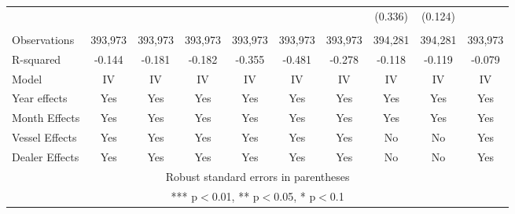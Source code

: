 \begin{tabular}{lccccccccc}
 &  &  &  &  &  &  & (0.336) & (0.124) &  \\
 &  &  &  &  &  &  &  &  &  \\
Observations & 393,973 & 393,973 & 393,973 & 393,973 & 393,973 & 393,973 & 394,281 & 394,281 & 393,973 \\
R-squared & -0.144 & -0.181 & -0.182 & -0.355 & -0.481 & -0.278 & -0.118 & -0.119 & -0.079 \\
Model & IV & IV & IV & IV & IV & IV & IV & IV & IV \\
Year effects & Yes & Yes & Yes & Yes & Yes & Yes & Yes & Yes & Yes \\
Month Effects & Yes & Yes & Yes & Yes & Yes & Yes & Yes & Yes & Yes \\
Vessel Effects & Yes & Yes & Yes & Yes & Yes & Yes & No & No & Yes \\
 Dealer Effects & Yes & Yes & Yes & Yes & Yes & Yes & No & No & Yes \\ \hline
\multicolumn{10}{c}{ Robust standard errors in parentheses} \\
\multicolumn{10}{c}{ *** p$<$0.01, ** p$<$0.05, * p$<$0.1} \\
\end{tabular}

